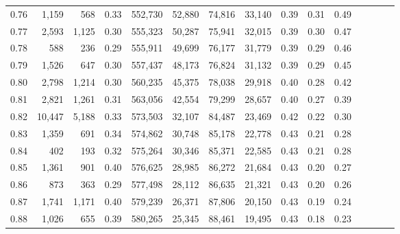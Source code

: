 \begin{tabular}{rrrcrrrrrrrrrrr}
0.76 &   1,159 &     568 &                                       0.33 &  552,730 &   52,880 &   74,816 &   33,140 &  0.39 &  0.31 &                         0.49 \\
0.77 &   2,593 &   1,125 &                                       0.30 &  555,323 &   50,287 &   75,941 &   32,015 &  0.39 &  0.30 &                         0.47 \\
0.78 &     588 &     236 &                                       0.29 &  555,911 &   49,699 &   76,177 &   31,779 &  0.39 &  0.29 &                         0.46 \\
0.79 &   1,526 &     647 &                                       0.30 &  557,437 &   48,173 &   76,824 &   31,132 &  0.39 &  0.29 &                         0.45 \\
0.80 &   2,798 &   1,214 &                                       0.30 &  560,235 &   45,375 &   78,038 &   29,918 &  0.40 &  0.28 &                         0.42 \\
0.81 &   2,821 &   1,261 &                                       0.31 &  563,056 &   42,554 &   79,299 &   28,657 &  0.40 &  0.27 &                         0.39 \\
0.82 &  10,447 &   5,188 &                                       0.33 &  573,503 &   32,107 &   84,487 &   23,469 &  0.42 &  0.22 &                         0.30 \\
0.83 &   1,359 &     691 &                                       0.34 &  574,862 &   30,748 &   85,178 &   22,778 &  0.43 &  0.21 &                         0.28 \\
0.84 &     402 &     193 &                                       0.32 &  575,264 &   30,346 &   85,371 &   22,585 &  0.43 &  0.21 &                         0.28 \\
0.85 &   1,361 &     901 &                                       0.40 &  576,625 &   28,985 &   86,272 &   21,684 &  0.43 &  0.20 &                         0.27 \\
0.86 &     873 &     363 &                                       0.29 &  577,498 &   28,112 &   86,635 &   21,321 &  0.43 &  0.20 &                         0.26 \\
0.87 &   1,741 &   1,171 &                                       0.40 &  579,239 &   26,371 &   87,806 &   20,150 &  0.43 &  0.19 &                         0.24 \\
0.88 &   1,026 &     655 &                                       0.39 &  580,265 &   25,345 &   88,461 &   19,495 &  0.43 &  0.18 &                         0.23 \\

\end{tabular}
